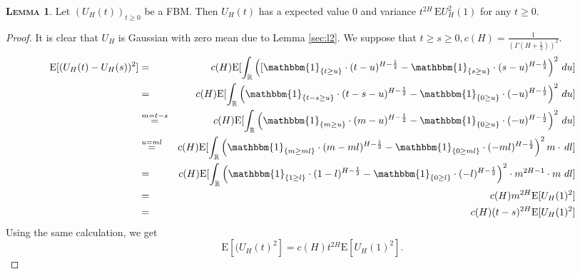 \documentclass[a4paper, twoside, 11pt]{article}
\theoremstyle{definition}
\newtheorem{lemma}[definition]{\scshape Lemma}
\newcommand{\brkt}[1]{\left({#1} \right)}
\begin{document}
\begin{lemma}
  Let $(U_H(t))_{t\ge 0}$ be a FBM. Then $U_H(t)$ has a expected value $0$ and variance $t^{2H}\, \mathrm{E} U^2_H(1)$ for any $t \ge 0$.
  \label{sec:fbmp1}
\end{lemma}
\begin{proof}
  It is clear that $U_H$ is Gaussian with zero mean due to Lemma \ref{sec:l2}. We suppose that $t \ge s \ge 0,  c(H)=\frac{1}{(\Gamma(H+\frac{1}{2}))^2}$.
  \begin{eqnarray}
	\mathrm{E}[(U_H(t) - U_H(s))^2] &=& c(H)\mathrm{E}[\int_{\mathbb{R}} \brkt{[\mathbbm{1}_{\{t\ge u\}}\cdot(t-u)^{H-\frac{1}{2}}  - \mathbbm{1}_{\{s\ge u\}}\cdot(s-u)^{H-\frac{1}{2}}}^2 \,\mathop{du}]\nonumber\\
	&=& c(H)\mathrm{E}[\int_{\mathbb{R}} \brkt{\mathbbm{1}_{\{t-s \ge u\}}\cdot(t-s-u)^{H-\frac{1}{2}}  - \mathbbm{1}_{\{0\ge u\}}\cdot(-u)^{H-\frac{1}{2}}}^2 \,\mathop{du}]\nonumber\\
	&\overset{m=t-s}{=}& c(H)\mathrm{E}[\int_{\mathbb{R}} \brkt{\mathbbm{1}_{\{m \ge u\}}\cdot(m-u)^{H-\frac{1}{2}}  - \mathbbm{1}_{\{0\ge u\}}\cdot(-u)^{H-\frac{1}{2}}}^2 \,\mathop{du}]\nonumber\\
	&\overset{u=ml}{=}& c(H)\mathrm{E}[\int_{\mathbb{R}} \brkt{\mathbbm{1}_{\{m \ge ml\}}\cdot(m-ml)^{H-\frac{1}{2}}  - \mathbbm{1}_{\{0\ge ml\}}\cdot(-ml)^{H-\frac{1}{2}}}^2 m\cdot\,\mathop{dl}]\nonumber\\
	&=& c(H)\mathrm{E}[\int_{\mathbb{R}} \brkt{\mathbbm{1}_{\{1 \ge l \}}\cdot(1-l)^{H-\frac{1}{2}}  - \mathbbm{1}_{\{0\ge l\}}\cdot(-l)^{H-\frac{1}{2}}}^2 \cdot m^{2H-1}\cdot m\,\mathop{dl}]\nonumber\\
	&=& c(H)m^{2H}\mathrm{E}[U_H(1)^2]\nonumber\\
	&=& c(H)(t-s)^{2H}\mathrm{E}[U_H(1)^2]
	\label{sec:eqn1}
  \end{eqnarray}
  Using the same calculation, we get
  \begin{equation}
	\mathrm{E}[(U_H(t)^2] = c(H)t^{2H}\mathrm{E}[U_H(1)^2].
	\label{sec:eqn2}
  \end{equation}


\end{proof}
\end{document}

